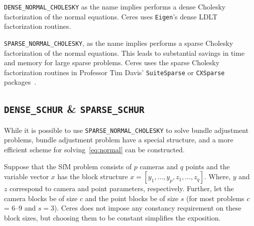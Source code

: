 \texttt{DENSE\_NORMAL\_CHOLESKY}  as the name implies performs a dense
Cholesky factorization of the normal equations. Ceres uses
\texttt{Eigen}'s dense LDLT factorization routines.

\texttt{SPARSE\_NORMAL\_CHOLESKY}, as the name implies performs a
sparse Cholesky factorization of the normal equations. This leads to
substantial savings in time and memory for large sparse
problems. Ceres uses the sparse Cholesky factorization routines in  Professor Tim Davis'  \texttt{SuiteSparse} or
\texttt{CXSparse} packages~\cite{chen2006acs}.

\subsection{\texttt{DENSE\_SCHUR} \& \texttt{SPARSE\_SCHUR}}
While it is possible to use \texttt{SPARSE\_NORMAL\_CHOLESKY} to solve bundle adjustment problems, bundle adjustment problem have a special structure, and a more efficient scheme for solving~\eqref{eq:normal} can be constructed.

Suppose that the SfM problem consists of $p$ cameras and $q$ points and the variable vector $x$ has the  block structure $x = [y_{1},\hdots,y_{p},z_{1},\hdots,z_{q}]$. Where, $y$ and $z$ correspond to camera and point parameters, respectively.  Further, let the camera blocks be of size $c$ and the point blocks be of size $s$ (for most problems $c$ =  $6$--$9$ and $s = 3$). Ceres does not impose any constancy requirement on these block sizes, but choosing them to be constant simplifies the exposition.

